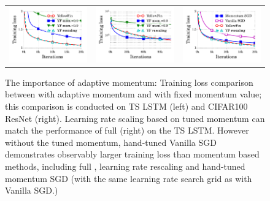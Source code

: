 \begin{figure}
\centering	
\begin{tabular}{c c c}
	\includegraphics[width=0.31\linewidth]{experiment_results/tf_charrnn_train_loss_fix_mom_and_lr_rescaling_cmp.pdf} &
	\includegraphics[width=0.31\linewidth]{experiment_results/resnet/resnet_bottleneck_loss_fix_mom_and_lr_rescaling_cmp} &
	\includegraphics[width=0.31\linewidth]{experiment_results/tf_charrnn_train_loss_mom_vanilla_yf.pdf}
\end{tabular}
\caption{The importance of adaptive momentum: Training loss comparison between \tuner with adaptive momentum and \tuner with fixed momentum value; this comparison is conducted on TS LSTM (left) and CIFAR100 ResNet (right). Learning rate scaling based on \tuner tuned momentum can match the performance of full \tuner (right) on the TS LSTM. However without the \tuner tuned momentum, hand-tuned Vanilla SGD demonstrates observably larger training loss than momentum based methods, including full \tuner, \tuner learning rate rescaling and hand-tuned momentum SGD (with the same learning rate search grid as with Vanilla SGD.)}
\label{fig:cmp_fix_mom}
\end{figure}

